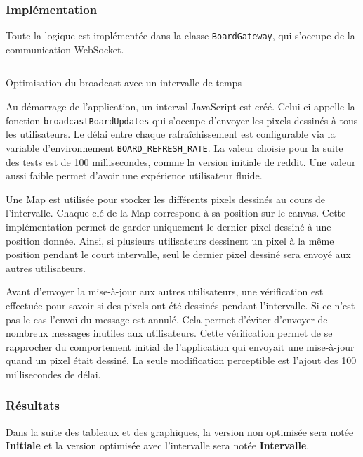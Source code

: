 \subsubsection{Implémentation}

Toute la logique est implémentée dans la classe \texttt{BoardGateway}, qui s'occupe de la communication WebSocket.

\begin{listing}[H]
  \inputminted[highlightlines={3,13,19,29}]{ts}{assets/figures/opti-interval.ts}
  \caption{Optimisation du broadcast avec un intervalle de temps}
  \label{listing:opti-interval}
\end{listing}

Au démarrage de l'application, un interval JavaScript est créé. Celui-ci appelle la fonction \texttt{broadcastBoardUpdates} qui s'occupe d'envoyer les pixels dessinés à tous les utilisateurs. Le délai entre chaque rafraîchissement est configurable via la variable d'environnement \texttt{BOARD_REFRESH_RATE}. La valeur choisie pour la suite des tests est de 100 millisecondes, comme la version initiale de \gls{reddit}. Une valeur aussi faible permet d'avoir une expérience utilisateur fluide.

Une Map est utilisée pour stocker les différents pixels dessinés au cours de l'intervalle. Chaque clé de la Map correspond à sa position sur le canvas. Cette implémentation permet de garder uniquement le dernier pixel dessiné à une position donnée. Ainsi, si plusieurs utilisateurs dessinent un pixel à la même position pendant le court intervalle, seul le dernier pixel dessiné sera envoyé aux autres utilisateurs.

Avant d'envoyer la mise-à-jour aux autres utilisateurs, une vérification est effectuée pour savoir si des pixels ont été dessinés pendant l'intervalle. Si ce n'est pas le cas l'envoi du message est annulé. Cela permet d'éviter d'envoyer de nombreux messages inutiles aux utilisateurs. Cette vérification permet de se rapprocher du comportement initial de l'application qui envoyait une mise-à-jour quand un pixel était dessiné. La seule modification perceptible est l'ajout des 100 millisecondes de délai.

\subsubsection{Résultats}

Dans la suite des tableaux et des graphiques, la version non optimisée sera notée \textbf{Initiale} et la version optimisée avec l'intervalle sera notée \textbf{Intervalle}.


